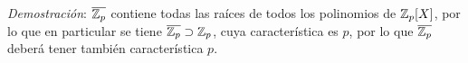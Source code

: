 \begin{prop} \leavevmode
        \item \textit{Demostración}: $\overline{\mathbb{Z}_p}$ contiene todas las raíces de todos los polinomios de $\mathbb{Z}_p[X]$, por lo que en particular se tiene $\overline{\mathbb{Z}_p} \supset\mathbb{Z}_p$, cuya característica es $p$, por lo que $\overline{\mathbb{Z}_p}$ deberá tener también característica $p$.
\end{prop}


